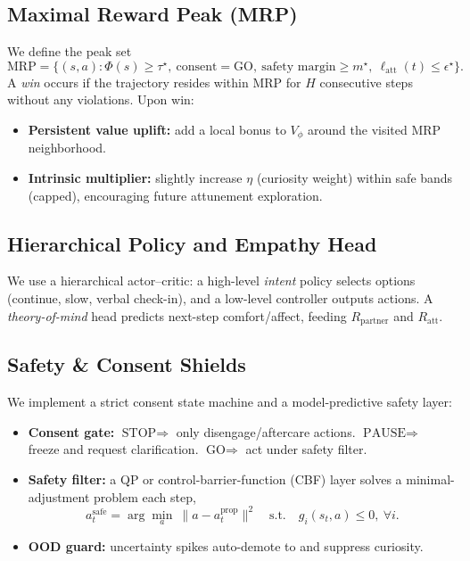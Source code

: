\documentclass[12pt]{article}
\begin{document}
\subsection{Maximal Reward Peak (MRP)}
We define the peak set
\begin{equation}
\text{MRP} = \big\{(s,a): \Phi(s)\ge\tau^\star,\ \text{consent}=\text{GO},\ \text{safety margin}\ge m^\star,\ \ell_{\text{att}}(t)\le \epsilon^\star \big\}.
\end{equation}
A \emph{win} occurs if the trajectory resides within MRP for $H$ consecutive steps without any violations. Upon win:
\begin{itemize}[leftmargin=*]
  \item \textbf{Persistent value uplift:} add a local bonus to $V_\phi$ around the visited MRP neighborhood.
  \item \textbf{Intrinsic multiplier:} slightly increase $\eta$ (curiosity weight) within safe bands (capped), encouraging future attunement exploration.
\end{itemize}

\subsection{Hierarchical Policy and Empathy Head}
We use a hierarchical actor--critic: a high-level \emph{intent} policy selects options (continue, slow, verbal check-in), and a low-level controller outputs actions. A \emph{theory-of-mind} head predicts next-step comfort/affect, feeding $R_{\text{partner}}$ and $R_{\text{att}}$.

\subsection{Safety \& Consent Shields}
\label{sec:safety}
We implement a strict consent state machine and a model-predictive safety layer:
\begin{itemize}[leftmargin=*]
  \item \textbf{Consent gate:} $\text{STOP}\!\Rightarrow$ only disengage/aftercare actions. $\text{PAUSE}\!\Rightarrow$ freeze and request clarification. $\text{GO}\!\Rightarrow$ act under safety filter.
  \item \textbf{Safety filter:} a QP or control-barrier-function (CBF) layer solves a minimal-adjustment problem each step,
  \[
  a_t^{\text{safe}} = \arg\min_{a} \ \|a-a_t^{\text{prop}}\|^2 \quad \text{s.t.}\quad g_i(s_t,a)\le 0,\ \forall i.
  \]
  \item \textbf{OOD guard:} uncertainty spikes auto-demote to  and suppress curiosity.
\end{itemize}
\end{document}

